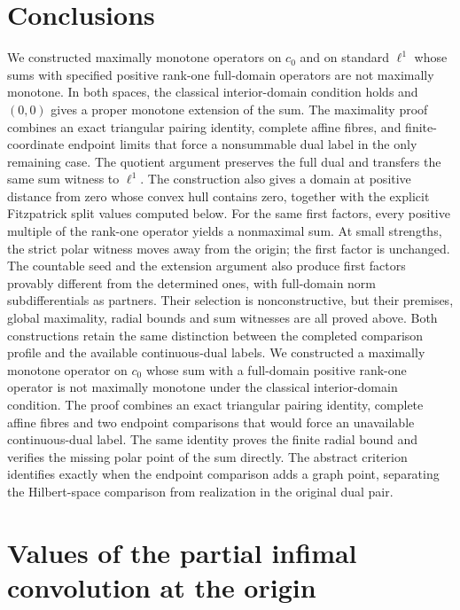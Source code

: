 \documentclass[11pt]{article}
\begin{document}
\ifdefined\expandedversion

\else

\fi

\section{Conclusions}
\label{sec:conclusion}
\ifdefined\expandedversion
We constructed maximally monotone operators on $c_0$ and on standard
$\ell^1$ whose sums with specified positive rank-one full-domain
operators are not maximally monotone. In both spaces, the classical
interior-domain condition holds and $(0,0)$ gives a proper monotone
extension of the sum. The maximality proof combines an exact triangular
pairing identity, complete affine fibres, and finite-coordinate endpoint
limits that force a nonsummable dual label in the only remaining case.
The quotient argument preserves the full dual and transfers the same
sum witness to $\ell^1$. The construction also gives a domain at
positive distance from zero whose convex hull contains zero, together
with the explicit Fitzpatrick split values computed below.
For the same first factors, every positive multiple of the rank-one
operator yields a nonmaximal sum. At small strengths, the strict polar
witness moves away from the origin; the first factor is unchanged.
The countable seed and the extension argument also produce first factors
provably different from the determined ones, with full-domain norm
subdifferentials as partners. Their selection is nonconstructive, but
their premises, global maximality, radial bounds and sum witnesses are
all proved above. Both constructions retain the same distinction between
the completed comparison profile and the available continuous-dual labels.
\else
We constructed a maximally monotone operator on $c_0$ whose sum with a
full-domain positive rank-one operator is not maximally monotone under
the classical interior-domain condition. The proof combines an exact
triangular pairing identity, complete affine fibres and two endpoint
comparisons that would force an unavailable continuous-dual label.
The same identity proves the finite radial bound and verifies the
missing polar point of the sum directly. The abstract criterion
identifies exactly when the endpoint comparison adds a graph point,
separating the Hilbert-space comparison from realization in the
original dual pair.
\fi

\ifdefined\expandedversion
\appendix
\section{Values of the partial infimal convolution at the origin}
\label{sec:split}
\end{document}
